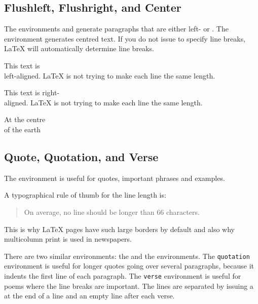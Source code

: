 \subsection{Flushleft, Flushright, and Center}

The environments  and  generate
paragraphs that are either left- or .  The  environment generates centred text. If you
do not issue \ci{\bs} to specify line breaks, \LaTeX{} will
automatically determine line breaks.

\begin{example}
\begin{flushleft}
This text is\\ left-aligned. 
\LaTeX{} is not trying to make 
each line the same length.
\end{flushleft}
\end{example}

\begin{example}
\begin{flushright}
This text is right-\\aligned. 
\LaTeX{} is not trying to make
each line the same length.
\end{flushright}
\end{example}

\begin{example}
\begin{center}
At the centre\\of the earth
\end{center}
\end{example}

\subsection{Quote, Quotation, and Verse}

The  environment is useful for quotes, important phrases and
examples.

\begin{example}
A typographical rule of thumb
for the line length is:
\begin{quote}
On average, no line should
be longer than 66 characters.
\end{quote}
This is why \LaTeX{} pages have 
such large borders by default and
also why multicolumn print is
used in newspapers.
\end{example}

There are two similar environments: the  and the
 environments. The \texttt{quotation} environment is useful
for longer quotes going over several paragraphs, because it indents the
first line of each paragraph. The \texttt{verse} environment is useful for poems
where the line breaks are important. The lines are separated by
issuing a \ci{\bs} at the end of a line and an empty line after each
verse.



